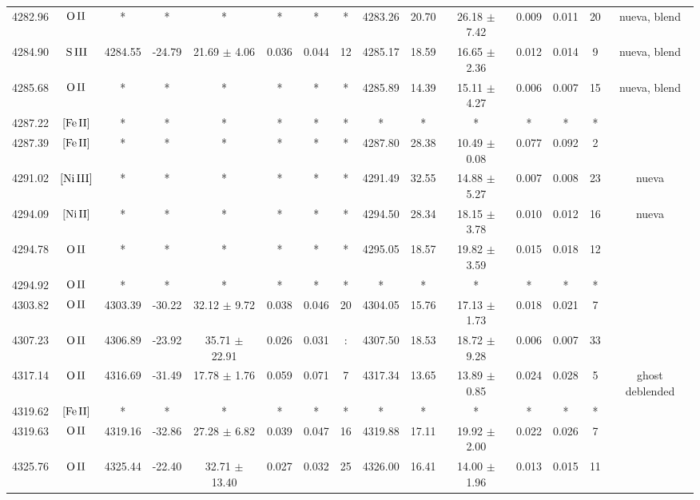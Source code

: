\documentclass{article}
\begin{document}
\begin{table*}
\begin{adjustbox}{width=\textwidth}
\begin{tabular}{ccccccccccccccc}
4282.96 & $\mbox{O}\thinspace \mbox{II}$ & * & * & * & * & * & * & 4283.26 & 20.70 & 26.18 $\pm$ 7.42 & 0.009 & 0.011 & 20 &  nueva, blend \\
4284.90 & $\mbox{S}\thinspace \mbox{III}$ & 4284.55 & -24.79 & 21.69 $\pm$ 4.06 & 0.036 & 0.044 & 12 & 4285.17 & 18.59 & 16.65 $\pm$ 2.36 & 0.012 & 0.014 & 9 &  nueva, blend \\
4285.68 & $\mbox{O}\thinspace \mbox{II}$ & * & * & * & * & * & * & 4285.89 & 14.39 & 15.11 $\pm$ 4.27 & 0.006 & 0.007 & 15 &  nueva, blend \\
4287.22 & $\mbox{[Fe}\thinspace \mbox{II]}$ & * & * & * & * & * & * & * & * & * & * & * & * &  \\
4287.39 & $\mbox{[Fe}\thinspace \mbox{II]}$ & * & * & * & * & * & * & 4287.80 & 28.38 & 10.49 $\pm$ 0.08 & 0.077 & 0.092 & 2 &  \\
4291.02 & $\mbox{[Ni}\thinspace \mbox{III]}$ & * & * & * & * & * & * & 4291.49 & 32.55 & 14.88 $\pm$ 5.27 & 0.007 & 0.008 & 23 &  nueva \\
4294.09 & $\mbox{[Ni}\thinspace \mbox{II]}$ & * & * & * & * & * & * & 4294.50 & 28.34 & 18.15 $\pm$ 3.78 & 0.010 & 0.012 & 16 &  nueva \\
4294.78 & $\mbox{O}\thinspace \mbox{II}$ & * & * & * & * & * & * & 4295.05 & 18.57 & 19.82 $\pm$ 3.59 & 0.015 & 0.018 & 12 &  \\
4294.92 & $\mbox{O}\thinspace \mbox{II}$ & * & * & * & * & * & * & * & * & * & * & * & * &  \\
4303.82 & $\mbox{O}\thinspace \mbox{II}$ & 4303.39 & -30.22 & 32.12 $\pm$ 9.72 & 0.038 & 0.046 & 20 & 4304.05 & 15.76 & 17.13 $\pm$ 1.73 & 0.018 & 0.021 & 7 &  \\
4307.23 & $\mbox{O}\thinspace \mbox{II}$ & 4306.89 & -23.92 & 35.71 $\pm$ 22.91 & 0.026 & 0.031 & : & 4307.50 & 18.53 & 18.72 $\pm$ 9.28 & 0.006 & 0.007 & 33 &  \\
4317.14 & $\mbox{O}\thinspace \mbox{II}$ & 4316.69 & -31.49 & 17.78 $\pm$ 1.76 & 0.059 & 0.071 & 7 & 4317.34 & 13.65 & 13.89 $\pm$ 0.85 & 0.024 & 0.028 & 5 &  ghost deblended \\
4319.62 & $\mbox{[Fe}\thinspace \mbox{II]}$ & * & * & * & * & * & * & * & * & * & * & * & * &  \\
4319.63 & $\mbox{O}\thinspace \mbox{II}$ & 4319.16 & -32.86 & 27.28 $\pm$ 6.82 & 0.039 & 0.047 & 16 & 4319.88 & 17.11 & 19.92 $\pm$ 2.00 & 0.022 & 0.026 & 7 &  \\
4325.76 & $\mbox{O}\thinspace \mbox{II}$ & 4325.44 & -22.40 & 32.71 $\pm$ 13.40 & 0.027 & 0.032 & 25 & 4326.00 & 16.41 & 14.00 $\pm$ 1.96 & 0.013 & 0.015 & 11 &  \\

\end{tabular}
\end{adjustbox}
\end{table*}
\end{document}
